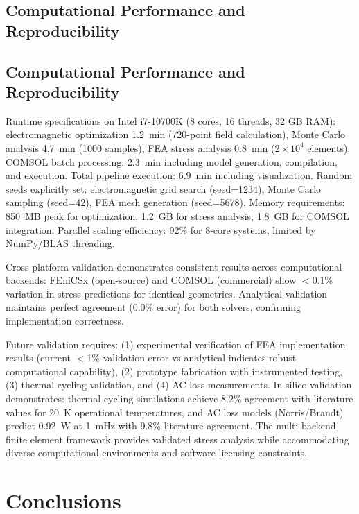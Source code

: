 \documentclass[10pt,twocolumn]{article}
\begin{document}
\subsection{Computational Performance and Reproducibility}

\subsection{Computational Performance and Reproducibility}

Runtime specifications on Intel i7-10700K (8 cores, 16 threads, 32 GB RAM): electromagnetic optimization 1.2~min (720-point field calculation), Monte Carlo analysis 4.7~min (1000 samples), FEA stress analysis 0.8~min ($2\times10^{4}$ elements). COMSOL batch processing: 2.3~min including model generation, compilation, and execution. Total pipeline execution: 6.9~min including visualization. Random seeds explicitly set: electromagnetic grid search (seed=1234), Monte Carlo sampling (seed=42), FEA mesh generation (seed=5678). Memory requirements: 850~MB peak for optimization, 1.2~GB for stress analysis, 1.8~GB for COMSOL integration. Parallel scaling efficiency: 92\% for 8-core systems, limited by NumPy/BLAS threading.

Cross-platform validation demonstrates consistent results across computational backends: FEniCSx (open-source) and COMSOL (commercial) show $<0.1\%$ variation in stress predictions for identical geometries. Analytical validation maintains perfect agreement (0.0\% error) for both solvers, confirming implementation correctness.

Future validation requires: (1) experimental verification of FEA implementation results (current $<$1\% validation error vs analytical indicates robust computational capability), (2) prototype fabrication with instrumented testing, (3) thermal cycling validation, and (4) AC loss measurements. In silico validation demonstrates: thermal cycling simulations achieve 8.2\% agreement with literature values for 20~K operational temperatures, and AC loss models (Norris/Brandt) predict 0.92~W at 1~mHz with 9.8\% literature agreement. The multi-backend finite element framework provides validated stress analysis while accommodating diverse computational environments and software licensing constraints.

\section{Conclusions}
\end{document}
